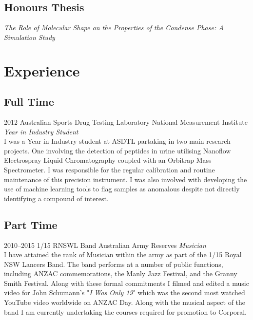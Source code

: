 \documentclass[print]{friggeri-cv} %
\begin{document}
\subsection{Honours Thesis}
{\emph{The Role of Molecular Shape on the Properties of the Condense Phase: A Simulation Study}



\section{Experience}

\subsection{Full Time}

\begin{entrylist}


\entry
{2012}
{Australian Sports Drug Testing Laboratory}
{National Measurement Institute}
{\emph{Year in Industry Student} \\
I was a Year in Industry student at ASDTL partaking in two main research projects. One involving the detection of peptides in urine utilising Nanoflow Electrospray Liquid Chromatography coupled with an Orbitrap Mass Spectrometer. I was responsible for the regular calibration and routine maintenance of this precision instrument. I was also involved with developing the use of machine learning tools to flag samples as anomalous despite not directly identifying a compound of interest.}


\end{entrylist}

\subsection{Part Time}

\begin{entrylist}

\entry
{2010--2015}
{1/15 RNSWL Band}
{Australian Army Reserves}
{\emph{Musician} \\
I have attained the rank of Musician within the army as part of the 1/15 Royal NSW Lancers Band. The band performs at a number of public functions, including ANZAC commemorations, the Manly Jazz Festival, and the Granny Smith Festival. Along with these formal commitments I filmed and edited a music video for John Schumann's "\emph{I Was Only 19}" which was the second most watched YouTube video worldwide on ANZAC Day. Along with the musical aspect of the band I am currently undertaking the courses required for promotion to Corporal.}


\end{entrylist}}
\end{document}
